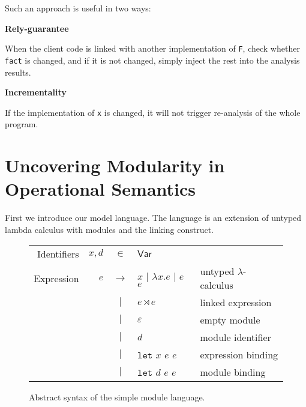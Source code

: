 \documentclass[acmsmall,screen,review]{acmart}\settopmatter{printfolios=true,printccs=false,printacmref=false}
\newcommand*{\vbar}{|}
\newcommand*{\ExprVar}{\mathsf{Var}}
\newcommand*{\modid}{d}
\newcommand*{\link}[2]{{#1}\rtimes{#2}}
\newcommand*{\Let}{\mathtt{let}}
\begin{document}
Such an approach is useful in two ways:

\noindent\textbf{Rely-guarantee}

When the client code is linked with another implementation of \texttt{F}, check whether \texttt{fact} is changed, and if it is not changed, simply inject the rest into the analysis results.

\noindent\textbf{Incrementality}

If the implementation of \texttt{x} is changed, it will not trigger re-analysis of the whole program.

\section{Uncovering Modularity in Operational Semantics}
First we introduce our model language.
The language is an extension of untyped lambda calculus with modules and the linking construct.
\begin{figure}[h!]
  \footnotesize
  \centering
  \begin{tabular}{rrcll}
    Identifiers & $x,\modid$ & $\in$         & $\ExprVar$                                                             \\
    Expression  & $e$        & $\rightarrow$ & $x$ $\vbar$ $\lambda x.e$ $\vbar$ $e$ $e$ & untyped $\lambda$-calculus \\
                &            & $\vbar$       & $\link{e}{e}$                             & linked expression          \\
                &            & $\vbar$       & $\varepsilon$                             & empty module               \\
                &            & $\vbar$       & $\modid$                                  & module identifier          \\
                &            & $\vbar$       & $\Let$ $x$ $e$ $e$                        & expression binding         \\
                &            & $\vbar$       & $\Let$ $\modid$ $e$ $e$                   & module binding             \\
  \end{tabular}
  \caption{Abstract syntax of the simple module language.}
  \label{fig:syntax}
\end{figure}
\end{document}
